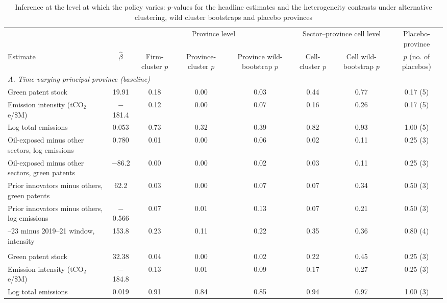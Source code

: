 \begin{table}[htbp]\centering\footnotesize
\caption{Inference at the level at which the policy varies: $p$-values for the headline estimates and the heterogeneity contrasts under alternative clustering, wild cluster bootstraps and placebo provinces}
\label{tab:inference}
\begin{adjustbox}{max width=\textwidth}
\begin{tabular}{lccccccc}
\toprule
 & & \multicolumn{3}{c}{Province level} & \multicolumn{2}{c}{Sector--province cell level} & Placebo-province \\
\cmidrule(lr){3-5}\cmidrule(lr){6-7}
Estimate & $\hat\beta$ & Firm-cluster $p$ & Province-cluster $p$ & Province wild-bootstrap $p$ & Cell-cluster $p$ & Cell wild-bootstrap $p$ & $p$ (no. of placebos) \\
\midrule
\multicolumn{8}{l}{\textit{A. Time-varying principal province (baseline)}} \\
\quad Green patent stock & 19.91 & 0.18 & 0.00 & 0.03 & 0.44 & 0.77 & 0.17 (5) \\
\quad Emission intensity (tCO$_2$e/\$M) & $-$181.4 & 0.12 & 0.00 & 0.07 & 0.16 & 0.26 & 0.17 (5) \\
\quad Log total emissions & 0.053 & 0.73 & 0.32 & 0.39 & 0.82 & 0.93 & 1.00 (5) \\
\quad Oil-exposed minus other sectors, log emissions & 0.780 & 0.01 & 0.00 & 0.06 & 0.02 & 0.11 & 0.25 (3) \\
\quad Oil-exposed minus other sectors, green patents & $-$86.2 & 0.00 & 0.00 & 0.02 & 0.03 & 0.11 & 0.25 (3) \\
\quad Prior innovators minus others, green patents & 62.2 & 0.03 & 0.00 & 0.07 & 0.07 & 0.34 & 0.50 (3) \\
\quad Prior innovators minus others, log emissions & $-$0.566 & 0.07 & 0.01 & 0.13 & 0.07 & 0.21 & 0.50 (3) \\
\quad 2022--23 minus 2019--21 window, intensity & 153.8 & 0.23 & 0.11 & 0.22 & 0.35 & 0.36 & 0.80 (4) \\
\addlinespace
\multicolumn{8}{l}{\textit{B. Fixed 2018 principal province}} \\
\quad Green patent stock & 32.38 & 0.04 & 0.00 & 0.02 & 0.22 & 0.45 & 0.25 (3) \\
\quad Emission intensity (tCO$_2$e/\$M) & $-$184.8 & 0.13 & 0.01 & 0.09 & 0.17 & 0.27 & 0.25 (3) \\
\quad Log total emissions & 0.019 & 0.91 & 0.84 & 0.85 & 0.94 & 0.97 & 1.00 (3) \\

\end{tabular}
\end{adjustbox}
\end{table}
